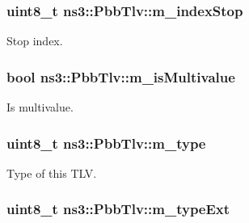\subsubsection[{\texorpdfstring{m\+\_\+index\+Stop}{m_indexStop}}]{\setlength{\rightskip}{0pt plus 5cm}uint8\+\_\+t ns3\+::\+Pbb\+Tlv\+::m\+\_\+index\+Stop\hspace{0.3cm}{\ttfamily [private]}}\hypertarget{classns3_1_1PbbTlv_a1891c005ff2c6c707345bf580848d9ec}{}\label{classns3_1_1PbbTlv_a1891c005ff2c6c707345bf580848d9ec}


Stop index. 

\subsubsection[{\texorpdfstring{m\+\_\+is\+Multivalue}{m_isMultivalue}}]{\setlength{\rightskip}{0pt plus 5cm}bool ns3\+::\+Pbb\+Tlv\+::m\+\_\+is\+Multivalue\hspace{0.3cm}{\ttfamily [private]}}\hypertarget{classns3_1_1PbbTlv_a16f0e5c3dd8ff010c809d1ad7ec7caa9}{}\label{classns3_1_1PbbTlv_a16f0e5c3dd8ff010c809d1ad7ec7caa9}


Is multivalue. 

\subsubsection[{\texorpdfstring{m\+\_\+type}{m_type}}]{\setlength{\rightskip}{0pt plus 5cm}uint8\+\_\+t ns3\+::\+Pbb\+Tlv\+::m\+\_\+type\hspace{0.3cm}{\ttfamily [private]}}\hypertarget{classns3_1_1PbbTlv_a5ce6eb47d11aa385cd606cbd90eafdec}{}\label{classns3_1_1PbbTlv_a5ce6eb47d11aa385cd606cbd90eafdec}


Type of this T\+LV. 

\subsubsection[{\texorpdfstring{m\+\_\+type\+Ext}{m_typeExt}}]{\setlength{\rightskip}{0pt plus 5cm}uint8\+\_\+t ns3\+::\+Pbb\+Tlv\+::m\+\_\+type\+Ext\hspace{0.3cm}{\ttfamily [private]}}\hypertarget{classns3_1_1PbbTlv_abd6bb11be5d5b88924111ecaf852c2c6}{}\label{classns3_1_1PbbTlv_abd6bb11be5d5b88924111ecaf852c2c6}


